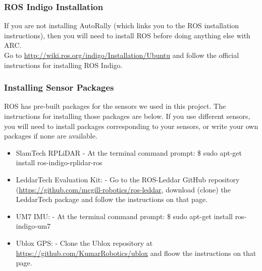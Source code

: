\documentclass[compsoc,draftclsnofoot,onecolumn,10pt]{IEEEtran}
\begin{document}
\subsubsection{ROS Indigo Installation}
If you are not installing AutoRally (which links you to the ROS installation instructions), then you will need to install ROS before doing anything else with ARC.\\
Go to \href{http://wiki.ros.org/indigo/Installation/Ubuntu}{http://wiki.ros.org/indigo/Installation/Ubuntu} and follow the official instructions for installing ROS Indigo.

 \subsubsection{Installing Sensor Packages}
ROS has pre-built packages for the sensors we used in this project. The instructions for installing those packages are below. If you use different sensors, you will need to install packages corresponding to your sensors, or write your own packages if none are available.
 \begin{itemize}
     \item SlamTech RPLiDAR
     \subitem - At the terminal command prompt:
     \subitem \$ sudo apt-get install ros-indigo-rplidar-ros
     \item LeddarTech Evaluation Kit:
     \subitem - Go to the ROS-Leddar GitHub repository (\href{https://github.com/mcgill-robotics/ros-leddar}{https://github.com/mcgill-robotics/ros-leddar}, download (clone) the LeddarTech package and follow the instructions on that page.
     \item UM7 IMU:
     \subitem - At the terminal command prompt:
     \subitem \$ sudo apt-get install ros-indigo-um7
     \item Ublox GPS:
      \subitem - Clone the Ublox repository at       \href{https://github.com/KumarRobotics/ublox}{https://github.com/KumarRobotics/ublox} and floow the instructions on that page.
\end{itemize}
\end{document}
